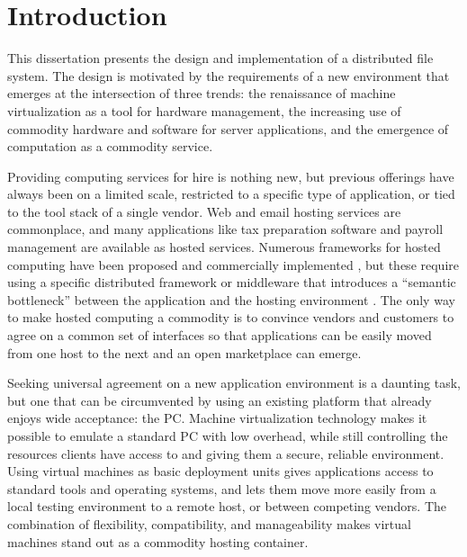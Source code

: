 \chapter{Introduction}

This dissertation presents the design and implementation of a distributed file system. The design is motivated by the requirements of a new environment that emerges at the intersection of three trends: the renaissance of machine virtualization as a tool for hardware management, the increasing use of commodity hardware and software for server applications, and the emergence of computation as a commodity service.

Providing computing services for hire is nothing new, but previous offerings have always been on a limited scale, restricted to a specific type of application, or tied to the tool stack of a single vendor. Web and email hosting services are commonplace, and many applications like tax preparation software and payroll management are available as hosted services. Numerous frameworks for hosted computing have been proposed \cite{amir,vahdat,tullmann} and commercially implemented \cite{amazon}, but these require using a specific distributed framework or middleware that introduces a ``semantic bottleneck'' between the application and the hosting environment \cite{roscoe00}. The only way to make hosted computing a commodity is to convince vendors and customers to agree on a common set of interfaces so that applications can be easily moved from one host to the next and an open marketplace can emerge.

Seeking universal agreement on a new application environment is a daunting task, but one that can be circumvented by using an existing platform that already enjoys wide acceptance: the PC. Machine virtualization technology makes it possible to emulate a standard PC with low overhead, while still controlling the resources clients have access to and giving them a secure, reliable environment. Using virtual machines as basic deployment units gives applications access to standard tools and operating systems, and lets them move more easily from a local testing environment to a remote host, or between competing vendors. The combination of flexibility, compatibility, and manageability makes virtual machines stand out as a commodity hosting container.

